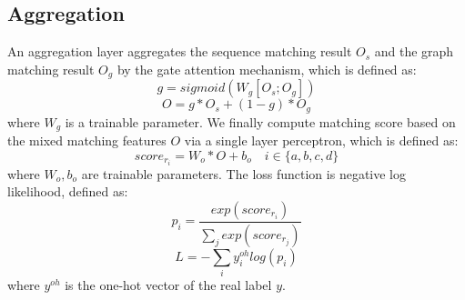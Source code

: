 \documentclass[letterpaper]{article} %
\begin{document}
\subsection{Aggregation}
An aggregation layer aggregates the sequence matching result $O_s$ and the graph matching result $O_g$ by the gate attention mechanism, which is defined as:
\begin{equation}
    g=sigmoid(W_g [O_s;O_g])
\end{equation}
\begin{equation}
    O=g*O_s + (1-g) * O_g
\end{equation}
where $W_g$ is a trainable parameter. We finally compute matching score based on the mixed matching features $O$ via a single layer perceptron, which is defined as:
\begin{equation}
    score_{r_i}=W_o * O + b_o \quad i \in \{a,b,c,d\}
\end{equation}
where $W_o, b_o$ are trainable parameters. The loss function is negative log likelihood, defined as:
\begin{equation}
    p_i=\frac{exp(score_{r_i})}{\sum_j exp(score_{r_j})}
\end{equation}
\begin{equation}
    L=-\sum_i y_i^{oh} log(p_i)
\end{equation}
where $y^{oh}$ is the one-hot vector of the real label $y$.
\end{document}

